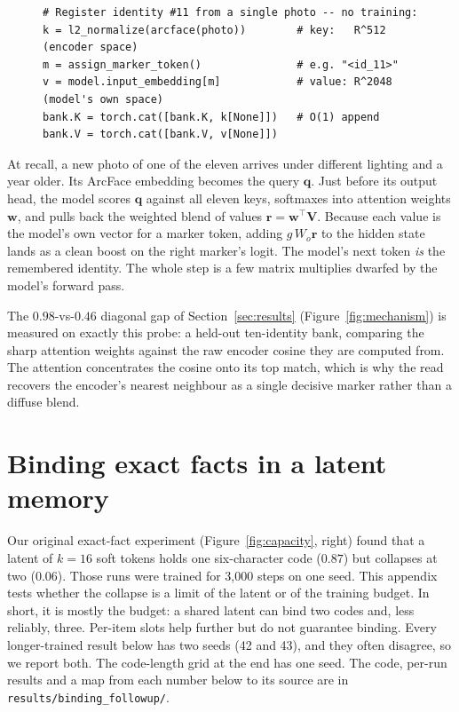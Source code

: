 \begin{figure}[h]
\begin{lstlisting}[caption={One registered identity is one row. The key is the encoder's view of the perception; the value is the model's own vector for the marker token that names it. Adding the row is a single tensor append.},label={lst:row}]
# Register identity #11 from a single photo -- no training:
k = l2_normalize(arcface(photo))        # key:   R^512  (encoder space)
m = assign_marker_token()               # e.g. "<id_11>"
v = model.input_embedding[m]            # value: R^2048 (model's own space)
bank.K = torch.cat([bank.K, k[None]])   # O(1) append
bank.V = torch.cat([bank.V, v[None]])
\end{lstlisting}
\end{figure}

At recall, a new photo of one of the eleven arrives under different lighting and a year older. Its ArcFace embedding becomes the query $\bm{q}$. Just before its output head, the model scores $\bm{q}$ against all eleven keys, softmaxes into attention weights $\bm{w}$, and pulls back the weighted blend of values $\bm{r}=\bm{w}^\top\bm{V}$. Because each value is the model's own vector for a marker token, adding $g\,W_o\bm{r}$ to the hidden state lands as a clean boost on the right marker's logit. The model's next token \emph{is} the remembered identity. The whole step is a few matrix multiplies dwarfed by the model's forward pass.

The $0.98$-vs-$0.46$ diagonal gap of Section~\ref{sec:results} (Figure~\ref{fig:mechanism}) is measured on exactly this probe: a held-out ten-identity bank, comparing the sharp attention weights against the raw encoder cosine they are computed from. The attention concentrates the cosine onto its top match, which is why the read recovers the encoder's nearest neighbour as a single decisive marker rather than a diffuse blend.


\section{Binding exact facts in a latent memory}
\label{app:binding}

Our original exact-fact experiment (Figure~\ref{fig:capacity}, right) found that a latent of $k{=}16$ soft tokens holds one six-character code ($0.87$) but collapses at two ($0.06$). Those runs were trained for 3{,}000 steps on one seed. This appendix tests whether the collapse is a limit of the latent or of the training budget. In short, it is mostly the budget: a shared latent can bind two codes and, less reliably, three. Per-item slots help further but do not guarantee binding. Every longer-trained result below has two seeds (42 and 43), and they often disagree, so we report both. The code-length grid at the end has one seed. The code, per-run results and a map from each number below to its source are in \texttt{results/binding\_followup/}.

